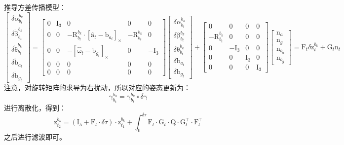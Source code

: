 \documentclass[12pt, onecolumn]{article}
\newcommand\liehat[1]{\left[ #1 \right]_\times}
\newcommand\bsm[1]{\boldsymbol{\mathrm{#1}}}
\newcommand\rotation[2]{{\bsm{R}_{#1}^{#2}}}
\begin{document}
	推导方差传播模型：
	\begin{equation}
	\begin{bmatrix}
	\delta\dot{\bsm{\alpha}}_{b_{t}}^{b_k}
	\\
	\delta\dot{\bsm{\beta}}_{b_{t}}^{b_k}
	\\
	\delta\dot{\bsm{\theta}}_{b_{t}}^{b_k}
	\\
	\delta\dot{\bsm{b}}_{a_{t}}
	\\
	\delta\dot{\bsm{b}}_{g_{t}}
	\end{bmatrix}=
	\begin{bmatrix}
	0&\bsm{I}_3&0&0&0\\
	0&0&-\rotation{b_t}{b_{k}}\cdot\liehat{\hat{\bsm{a}}_t-\bsm{b}_{a_t}}&-\rotation{b_t}{b_{k}}&0\\
	0&0&-\liehat{\hat{\bsm{\omega}}_t-\bsm{b}_{g_t}}&0&-\bsm{I}_3\\
	0&0&0&0&0\\0&0&0&0&0
	\end{bmatrix}
	\begin{bmatrix}
	\delta{\bsm{\alpha}}_{b_{t}}^{b_k}
	\\
	\delta{\bsm{\beta}}_{b_{t}}^{b_k}
	\\
	\delta{\bsm{\theta}}_{b_{t}}^{b_k}
	\\
	\delta{\bsm{b}}_{a_{t}}
	\\
	\delta{\bsm{b}}_{g_{t}}
	\end{bmatrix}+
	\begin{bmatrix}
	0&0&0&0\\
	-\rotation{b_t}{b_{k}}&0&0&0\\
	0&-\bsm{I}_3&0&0\\
	0&0&\bsm{I}_3&0\\
	0&0&0&\bsm{I}_3
	\end{bmatrix}\begin{bmatrix}
	\bsm{n}_a\\\bsm{n}_g\\\bsm{n}_{b_a}\\\bsm{n}_{b_g}
	\end{bmatrix}=\bsm{F}_t\delta\bsm{z}^{b_k}_{t}+\bsm{G}_{t}\bsm{n}_{t}
	\end{equation}
	注意，对旋转矩阵的求导为右扰动，所以对应的姿态更新为：
	\begin{equation}
	\bsm{\gamma}_{b_{t}}^{b_k}=\bsm{\gamma}_{b_{t}}^{b_k}\circ\delta\bsm{\gamma}
	\end{equation}
	进行离散化，得到：
	\begin{equation}
	\bsm{z}^{b_k}_{t_2}=\left( \bsm{I}_5+\bsm{F}_t\cdot\delta\tau\right)\cdot\bsm{z}^{b_k}_{t_1} +
	\int_{0}^{\delta \tau}\bsm{F}_t\cdot\bsm{G}_t\cdot\bsm{Q}\cdot\bsm{G}_t^\top\cdot\bsm{F}_t^\top
	\end{equation}
	之后进行滤波即可。
	
	
	
	
	
	
	
	
	
	
	
	
	
	
\end{document}
